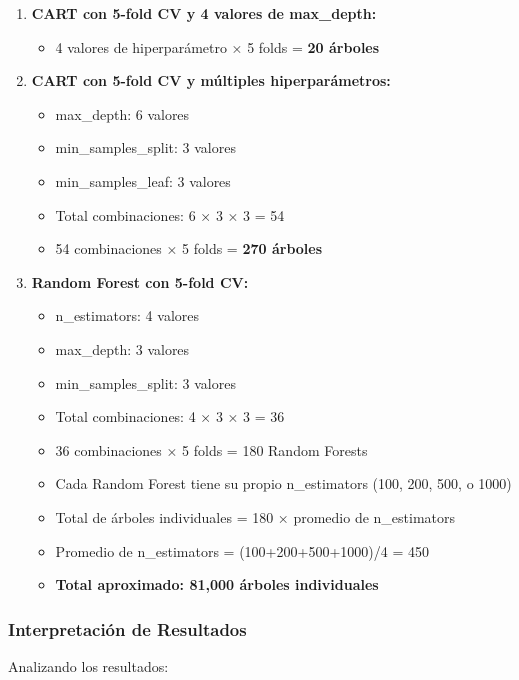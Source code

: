\documentclass[12pt]{article}
\begin{document}
\begin{enumerate}
    \item \textbf{CART con 5-fold CV y 4 valores de max\_depth:}
    \begin{itemize}
        \item 4 valores de hiperparámetro × 5 folds = \textbf{20 árboles}
    \end{itemize}
    
    \item \textbf{CART con 5-fold CV y múltiples hiperparámetros:}
    \begin{itemize}
        \item max\_depth: 6 valores
        \item min\_samples\_split: 3 valores  
        \item min\_samples\_leaf: 3 valores
        \item Total combinaciones: 6 × 3 × 3 = 54
        \item 54 combinaciones × 5 folds = \textbf{270 árboles}
    \end{itemize}
    
    \item \textbf{Random Forest con 5-fold CV:}
    \begin{itemize}
        \item n\_estimators: 4 valores
        \item max\_depth: 3 valores
        \item min\_samples\_split: 3 valores
        \item Total combinaciones: 4 × 3 × 3 = 36
        \item 36 combinaciones × 5 folds = 180 Random Forests
        \item Cada Random Forest tiene su propio n\_estimators (100, 200, 500, o 1000)
        \item Total de árboles individuales = 180 × promedio de n\_estimators
        \item Promedio de n\_estimators = (100+200+500+1000)/4 = 450
        \item \textbf{Total aproximado: 81,000 árboles individuales}
    \end{itemize}
\end{enumerate}

\subsubsection{Interpretación de Resultados}

Analizando los resultados:
\end{document}
